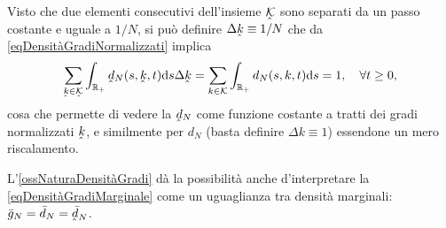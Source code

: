             \begin{oss}
                \label{ossNaturaDensitàGradi}
                Visto che due elementi consecutivi dell'insieme \(\underhat{\mathcal K}\) sono separati da un passo costante e uguale a \(1/N\), si può definire \(\Delta\underhat k\equiv1/N\) che da \cref{eqDensitàGradiNormalizzati} implica
                \[
                    \sum_{\underhat k\in\underhat{\mathcal K}}\int_{\RPlus}
                    \underhat d_N(s,\underhat k,t)\de s\Delta\underhat k
                    =\sum_{k\in\mathcal K}\int_{\RPlus}d_N(s,k,t)\de s=1,\quad\forall t\geq0,
                \]
                cosa che permette di vedere la \(\underhat d_N\) come funzione costante a tratti dei gradi normalizzati \(\underhat k\), e similmente per \(d_N\) (basta definire \(\Delta k\equiv1\)) essendone un mero riscalamento.
            \end{oss}

            \begin{oss}
                L'\cref{ossNaturaDensitàGradi} dà la possibilità anche d'interpretare la \cref{eqDensitàGradiMarginale} come un uguaglianza tra densità marginali: \(\bar g_N=\bar d_N=\bar{\underhat d}_N\).
            \end{oss}

